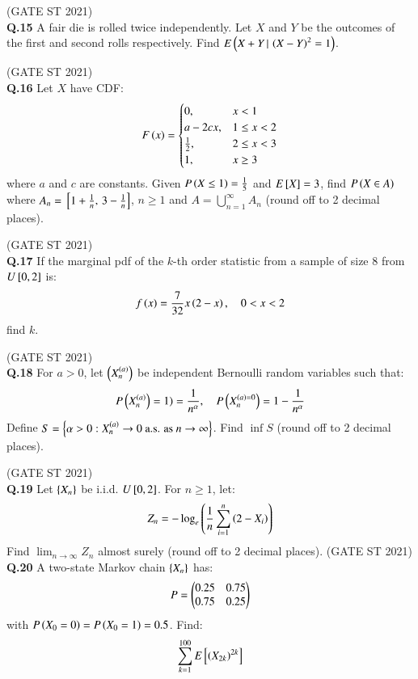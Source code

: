 \documentclass[journal,12pt,onecolumn]{IEEEtran}
\theoremstyle{remark}
\begin{document}
\hfill (GATE ST 2021) \\

\textbf{Q.15}
A fair die is rolled twice independently.  
Let $X$ and $Y$ be the outcomes of the first and second rolls respectively.  
Find $E\left(X + Y \, | \, \left(X - Y\right)^2 = 1\right)$.

\hfill (GATE ST 2021) \\

\textbf{Q.16}
Let $X$ have CDF:
\[
F\left(x\right) =
\begin{cases}
    
0, & x < 1 \\
a - 2c x, & 1 \le x < 2 \\
\frac12, & 2 \le x < 3 \\
1, & x \ge 3
\end{cases}
\]
where $a$ and $c$ are constants.  
Given $P\left(X \leq 1\right) = \frac15$ and $E{}\left[X\right] = 3$,  
find $P\left(X \in A\right)$ where $A_n = {}\left[1+\frac1n,\, 3 - \frac1n\right]$, $n \ge 1$ and $A = \bigcup_{n=1}^\infty A_n$ (round off to 2 decimal places).

\hfill (GATE ST 2021) \\


\textbf{Q.17}
If the marginal pdf of the $k$-th order statistic from a sample of size 8 from $U{}\left[0,2\right]$ is:
\[
f\left(x\right) = \frac{7}{32} x \left(2-x\right), \quad 0 < x < 2
\]
find $k$.

\hfill (GATE ST 2021) \\

\textbf{Q.18}
For $a > 0$, let $\left( X_n^{\left(a\right)} \right)$ be independent Bernoulli random variables such that:
\[
P\left(X_n^{\left(a\right)}\right) = 1) = \frac{1}{n^\alpha}, \quad P\left(X_n^{\left(a\right) = 0}\right) = 1 - \frac{1}{n^\alpha}
\]
Define $S = \left\{ \alpha > 0 : X_n^{\left(a\right)} \to 0 \ \text{a.s. as} \ n \to \infty \right\}$.  
Find $\inf S$ (round off to 2 decimal places).

\hfill (GATE ST 2021) \\

\textbf{Q.19}
Let $\left\{X_n\right\}$ be i.i.d. $U{}\left[0,2\right]$. For $n \ge 1$, let:
\[
Z_n = - \log_e \left( \frac{1}{n} \sum_{i=1}^n \left(2 - X_i\right) \right)
\]
Find $\lim_{n \to \infty} Z_n$ almost surely (round off to 2 decimal places).
\hfill (GATE ST 2021) \\

\textbf{Q.20}
A two-state Markov chain $\left\{X_n\right\}$ has:
\[
P = \begin{pmatrix} 0.25 & 0.75 \\ 0.75 & 0.25 \end{pmatrix}
\]
with $P\left(X_0 = 0\right) = P\left(X_0 = 1\right) = 0.5$. Find:
\[
\sum_{k=1}^{100} E{}\left[\left(X_{2k}\right)^{2k}\right]
\]
\end{document}

